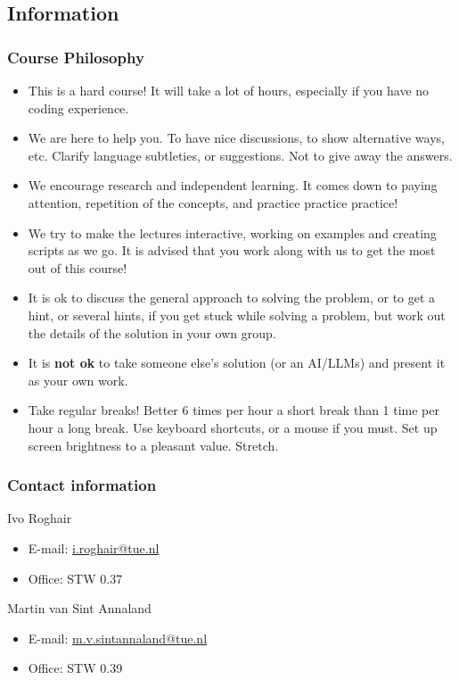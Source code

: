 \subsection{Information}
{\nologo
\begin{frame}
  \frametitle{Course Philosophy}
 \begin{itemize}
  \item This is a hard course! It will take a lot of hours, especially if you have no coding experience.
  \item We are here to help you. To have nice discussions, to show alternative ways, etc. Clarify language subtleties, or suggestions. Not to give away the answers.
  \item We encourage research and independent learning. It comes down to paying attention, repetition of the concepts, and practice practice practice! 
  \item We try to make the lectures interactive, working on examples and creating scripts as we go. It is advised that you work along with us to get the most out of this course!
  \item It is ok to discuss the general approach to solving the problem, or to get a hint, or several hints, if you get stuck while solving a problem, but work out the details of the solution in your own group.
  \item It is {\textbf{not ok}} to take someone else's solution (or an AI/LLMs) and present it as your own work.
  \item Take regular breaks! Better 6 times per hour a short break than 1 time per hour a long break. Use keyboard shortcuts, or a mouse if you must. Set up screen brightness to a pleasant value. Stretch.
\end{itemize}
\end{frame}
}

\begin{frame}
 \frametitle{Contact information}
 \begin{block}{Ivo Roghair}
  \begin{itemize}
   \item E-mail: \href{mailto:i.roghair@tue.nl}{i.roghair@tue.nl}
   \item Office: STW 0.37
   \end{itemize} 
 \end{block}
 \vspace{1em}
  \begin{block}{Martin van Sint Annaland}
  \begin{itemize}
   \item E-mail: \href{mailto:m.v.sintannaland@tue.nl}{m.v.sintannaland@tue.nl}
   \item Office: STW 0.39 
   \end{itemize} 
 \end{block}
\end{frame}

